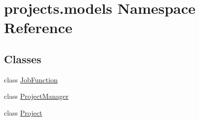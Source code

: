 \hypertarget{namespaceprojects_1_1models}{\section{projects.\-models Namespace Reference}
\label{namespaceprojects_1_1models}
}
\subsection*{Classes}
\begin{DoxyCompactItemize}
\item 
class \hyperlink{classprojects_1_1models_1_1_job_function}{Job\-Function}
\item 
class \hyperlink{classprojects_1_1models_1_1_project_manager}{Project\-Manager}
\item 
class \hyperlink{classprojects_1_1models_1_1_project}{Project}
\end{DoxyCompactItemize}
